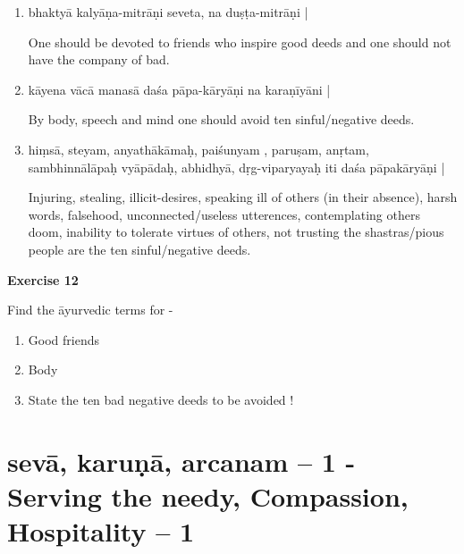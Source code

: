\begin{enumerate}
\item {}

bhaktyā kalyāṇa-mitrāṇi seveta, na duṣṭa-mitrāṇi |

One should be devoted to friends who inspire good deeds and one should not have the company of bad.

\item {}

kāyena vācā manasā daśa pāpa-kāryāṇi na karaṇīyāni | 

By body, speech and mind one should avoid ten sinful/negative deeds. 

\item {}

hiṃsā, steyam, anyathākāmaḥ, paiśunyam , paruṣam, anṛtam, sambhinnālāpaḥ vyāpādaḥ, abhidhyā, dṛg-viparyayaḥ iti daśa pāpakāryāṇi |  

Injuring, stealing, illicit-desires, speaking ill of others (in their absence), harsh words, falsehood, unconnected/useless utterences, contemplating others doom, inability to tolerate virtues of others, not trusting the shastras/pious people are the ten  sinful/negative deeds.
\end{enumerate}

\begin{center}
\textbf{\large Exercise 12}
\end{center}

Find the āyurvedic terms for -
\begin{enumerate}
\renewcommand{\theenumi}{\alph{enumi}}
\renewcommand{\labelenumi}{\theenumi.}
\item Good friends 
\item Body 
\item State the ten bad negative deeds to be avoided !
\end{enumerate}

\chapter{sevā, karuṇā, arcanam – 1 - Serving the needy, Compassion, Hospitality – 1}

